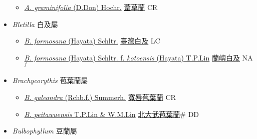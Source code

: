 \begin{itemize}
  \begin{itemize}
        \item[] \href{http://www.theplantlist.org/tpl1.1/search?q=Arundina+graminifolia}{\textit{A. graminifolia} (D.Don) Hochr.}   \href{\detokenize{http://taibnet.sinica.edu.tw/chi/taibnet_species_list.php?T2=葦草蘭&T2_new_value=true&fr=y}}{葦草蘭} CR
  \end{itemize}
 \item[] \textit{Bletilla} 白及屬
                    
  \begin{itemize}
        \item[] \href{http://www.theplantlist.org/tpl1.1/search?q=Bletilla+formosana}{\textit{B. formosana} (Hayata) Schltr.}   \href{\detokenize{http://taibnet.sinica.edu.tw/chi/taibnet_species_list.php?T2=臺灣白及&T2_new_value=true&fr=y}}{臺灣白及} LC
        \item[] \href{http://www.theplantlist.org/tpl1.1/search?q=Bletilla+formosana+ f. +kotoensis}{\textit{B. formosana} (Hayata) Schltr.  f.  \textit{kotoensis} (Hayata) T.P.Lin}   \href{\detokenize{http://taibnet.sinica.edu.tw/chi/taibnet_species_list.php?T2=蘭嶼白及&T2_new_value=true&fr=y}}{蘭嶼白及} NA$^f$
  \end{itemize}
 \item[] \textit{Brachycorythis} 苞葉蘭屬
                    
  \begin{itemize}
        \item[] \href{http://www.theplantlist.org/tpl1.1/search?q=Brachycorythis+galeandra}{\textit{B. galeandra} (Rchb.f.) Summerh.}   \href{\detokenize{http://taibnet.sinica.edu.tw/chi/taibnet_species_list.php?T2=寬唇苞葉蘭&T2_new_value=true&fr=y}}{寬唇苞葉蘭} CR
        \item[] \href{http://www.theplantlist.org/tpl1.1/search?q=Brachycorythis+peitawuensis}{\textit{B. peitawuensis} T.P.Lin \& W.M.Lin}   \href{\detokenize{http://taibnet.sinica.edu.tw/chi/taibnet_species_list.php?T2=北大武苞葉蘭&T2_new_value=true&fr=y}}{北大武苞葉蘭}\# DD
  \end{itemize}
 \item[] \textit{Bulbophyllum} 豆蘭屬
                    

\end{itemize}
